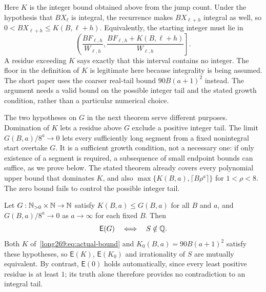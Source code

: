 \documentclass[11pt]{article}
\theoremstyle{remark}
\theoremstyle{plain}
\newcommand{\Esc}{\mathsf E}
\begin{document}
Here $K$ is the integer bound obtained above from the jump count.
Under the hypothesis that $BX_\ell$ is integral, the recurrence makes
$BX_{\ell+h}$ integral as well, so $0<BX_{\ell+h}\le K(B,\ell+h)$.
Equivalently, the starting integer must lie in
\[
 \left(\frac{BF_{\ell,h}}{W_{\ell,h}},
       \frac{BF_{\ell,h}+K(B,\ell+h)}{W_{\ell,h}}\right].
\]
A residue exceeding $K$ says exactly that this interval contains no
integer. The floor in the definition of $K$ is legitimate here because
integrality is being assumed. The short paper uses the coarser real-tail
bound $90B(a+1)^2$ instead. The argument needs a valid bound on the
possible integer tail and the stated growth condition, rather than a
particular numerical choice.

The two hypotheses on $G$ in the next theorem serve different purposes.
Domination of $K$ lets a residue above $G$ exclude a positive integer tail.
The limit $G(B,a)/8^a\to0$ lets every sufficiently long segment from a
fixed nonintegral start overtake $G$.  It is a sufficient growth condition,
not a necessary one: if only existence of a segment is required, a
subsequence of small endpoint bounds can suffice, as we prove below.
The stated theorem already covers every polynomial upper bound that
dominates $K$, and also $\max\{K(B,a),\lceil B\rho^a\rceil\}$ for
$1<\rho<8$.  The zero bound fails to control the possible integer tail.

\begin{theorem}\label{long269:res:actual-escape-endpoint}
\label{long269:res:lead-escape-equivalence}\label{long269:res:windowconsumer}
Let $G:\mathbb{N}_{>0}\times\mathbb{N}\to\mathbb{N}$ satisfy $K(B,a)\le G(B,a)$ for all $B$ and $a$,
and $G(B,a)/8^{a}\to0$ as $a\to\infty$ for each fixed $B$.  Then
\[
 \Esc(G)\quad\Longleftrightarrow\quad S\notin\Q .
\]
Both $K$ of~\eqref{long269:eq:actual-bound} and $K_0(B,a)=90B(a+1)^{2}$ satisfy these hypotheses, so $\Esc(K)$, $\Esc(K_0)$ and irrationality of $S$ are mutually
equivalent.  By contrast, $\Esc(0)$ holds automatically, since every
least positive residue is at least $1$; its truth alone therefore
provides no contradiction to an integral tail.
\end{theorem}
\end{document}
